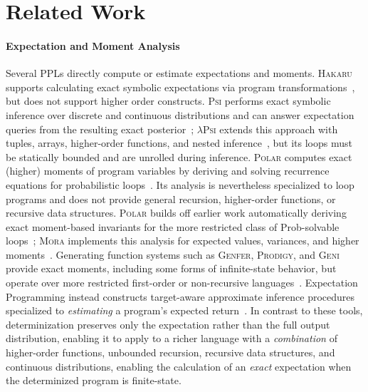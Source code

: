 \section{Related Work}
\label{sec:related-work}

\paragraph{Expectation and Moment Analysis}

Several PPLs directly compute or estimate expectations and moments. \textsc{Hakaru} supports calculating exact symbolic expectations via program transformations~\cite{zinkov2017composing}, but does not support higher order constructs. \textsc{Psi} performs exact symbolic inference over discrete and continuous distributions and can answer expectation queries from the resulting exact posterior~\cite{gehr2016psi}; \textsc{$\lambda$Psi} extends this approach with tuples, arrays, higher-order functions, and nested inference~\cite{gehr2020lpsi}, but its loops must be statically bounded and are unrolled during inference. \textsc{Polar} computes exact (higher) moments of program variables by deriving and solving recurrence equations for probabilistic loops~\cite{moosbrugger2022moment}. Its analysis is nevertheless specialized to loop programs and does not provide general recursion, higher-order functions, or recursive data structures. \textsc{Polar} builds off earlier work automatically deriving exact moment-based invariants for the more restricted class of Prob-solvable loops~\cite{bartocci2019automatic}; \textsc{Mora} implements this analysis for expected values, variances, and higher moments~\cite{bartocci2020mora}. Generating function systems such as \textsc{Genfer}, \textsc{Prodigy}, and \textsc{Geni} provide exact moments, including some forms of infinite-state behavior, but operate over more restricted first-order or non-recursive languages~\cite{zaiser2023genfer,klinkenberg2024loopy,li2025generating}. Expectation Programming instead constructs target-aware approximate inference procedures specialized to \emph{estimating} a program's expected return~\cite{reichelt2022expectation}. In contrast to these tools, determinization preserves only the expectation rather than the full output distribution, enabling it to apply to a richer language with a \emph{combination} of higher-order functions, unbounded recursion, recursive data structures, and continuous distributions, enabling the calculation of an \emph{exact} expectation when the determinized program is finite-state.

